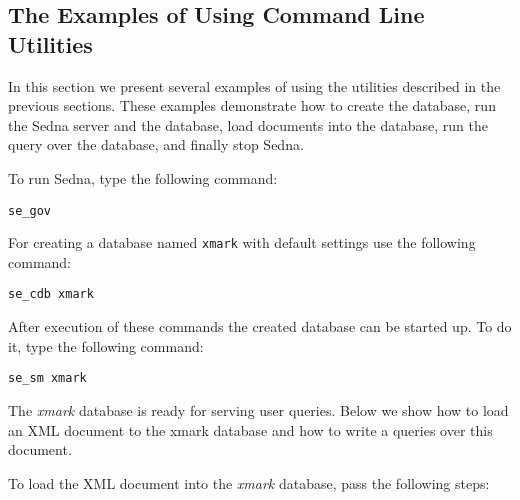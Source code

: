 \documentclass[a4paper,12pt]{article}
\begin{document}
\subsection{The Examples of Using Command Line Utilities}

In this section we present several examples of using the utilities described in
the previous sections. These examples demonstrate how to create the database,
run the Sedna server and the database, load documents into the database, run the
query over the database, and finally stop Sedna.

To run Sedna, type the following command:

\begin{verbatim}
se_gov
\end{verbatim}

For creating a database named \verb!xmark! with default settings use the
following command:

\begin{verbatim}
se_cdb xmark
\end{verbatim}

After execution of these commands the created database can be started up. To do
it, type the following command:

\begin{verbatim}
se_sm xmark
\end{verbatim}

The \emph{xmark} database is ready for serving user queries. Below we show how
to load an XML document to the xmark database and how to write a queries over
this document.

To load the XML document into the \emph{xmark} database, pass the following
steps:
\end{document}
